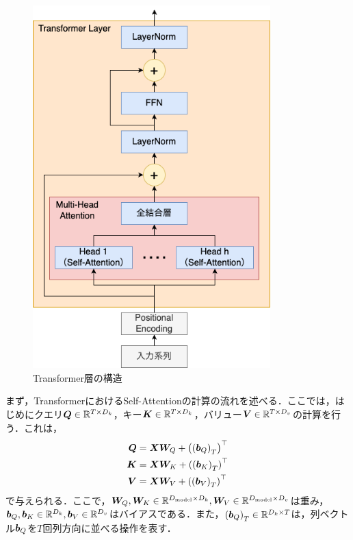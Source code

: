 \documentclass[12pt]{jarticle}
\numberwithin{equation}{section}    %
\numberwithin{figure}{section}      %
\numberwithin{table}{section}      %
\begin{document}
\begin{figure}[bt]
    \centering
    \includegraphics[height=140mm]{./figure/sec3/transformer.drawio.png}
    \caption{Transformer層の構造}
    \label{sec3:fig:transformer_layer}
\end{figure}

まず，TransformerにおけるSelf-Attentionの計算の流れを述べる．ここでは，はじめにクエリ$\bm{Q} \in \mathbb{R}^{T \times D_{k}}$，キー$\bm{K} \in \mathbb{R}^{T \times D_{k}}$，バリュー$\bm{V} \in \mathbb{R}^{T \times D_{v}}$の計算を行う．これは，
\begin{align}
    \bm{Q} & = \bm{X}\bm{W}_{Q} + \left(\left(\bm{b}_{Q}\right)_{T}\right)^\top \\
    \bm{K} & = \bm{X}\bm{W}_{K} + \left(\left(\bm{b}_{K}\right)_{T}\right)^\top \\
    \bm{V} & = \bm{X}\bm{W}_{V} + \left(\left(\bm{b}_{V}\right)_{T}\right)^\top
\end{align}
で与えられる．ここで，$\bm{W}_{Q}, \bm{W}_{K} \in \mathbb{R}^{D_{\text{model}} \times D_{k}}, \bm{W}_{V} \in \mathbb{R}^{D_{\text{model}} \times D_{v}}$は重み，$\bm{b}_{Q}, \bm{b}_{K} \in \mathbb{R}^{D_{k}}, \bm{b}_{V} \in \mathbb{R}^{D_{v}}$はバイアスである．また，$\left(\bm{b}_{Q}\right)_{T} \in \mathbb{R}^{D_{k} \times T}$は，列ベクトル$\bm{b}_{Q}$を$T$回列方向に並べる操作を表す．
\end{document}
